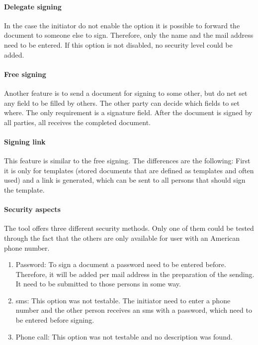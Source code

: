 \paragraph{Delegate signing}
In the case the initiator do not enable the option it is possible to forward the document to someone else to sign. Therefore, only the name and the mail address need to be entered. If this option is not disabled, no security level could be added.

\paragraph{Free signing}
Another feature is to send a document for signing to some other, but do net set any field to be filled by others. The other party can decide which fields to set where. The only requirement is a signature field. After the document is signed by all parties, all receives the completed document.

\paragraph{Signing link}
This feature is similar to the free signing. The differences are the following: First it is only for templates (stored documents that are defined as templates and often used) and a link is generated, which can be sent to all persons that should sign the template.

\paragraph{Security aspects}
The tool offers three different security methods. Only one of them could be tested through the fact that the others are only available for user with an American phone number.
\begin{enumerate}
	\item Password: To sign a document a password need to be entered before. Therefore, it will be added per mail address in the preparation of the sending. It need to be submitted to those persons in some way.
	\item \gls{sms}: This option was not testable. The initiator need to enter a phone number and the other person receives an \gls{sms} with a password, which need to be entered before signing.
	\item Phone call: This option was not testable and no description was found.
\end{enumerate}

